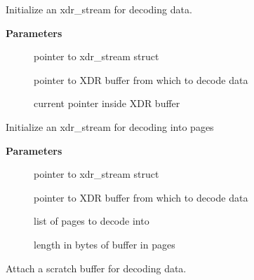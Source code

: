\documentclass[a4paper,8pt,english]{sphinxmanual}
\begin{document}
\begin{fulllineitems}
\label{networking/kapi:c.xdr_init_decode}
Initialize an xdr\_stream for decoding data.

\end{fulllineitems}


\textbf{Parameters}
\begin{description}
\item[{}] \leavevmode
pointer to xdr\_stream struct

\item[{}] \leavevmode
pointer to XDR buffer from which to decode data

\item[{}] \leavevmode
current pointer inside XDR buffer

\end{description}

\begin{fulllineitems}
\label{networking/kapi:c.xdr_init_decode_pages}
Initialize an xdr\_stream for decoding into pages

\end{fulllineitems}


\textbf{Parameters}
\begin{description}
\item[{}] \leavevmode
pointer to xdr\_stream struct

\item[{}] \leavevmode
pointer to XDR buffer from which to decode data

\item[{}] \leavevmode
list of pages to decode into

\item[{}] \leavevmode
length in bytes of buffer in pages

\end{description}

\begin{fulllineitems}
\label{networking/kapi:c.xdr_set_scratch_buffer}
Attach a scratch buffer for decoding data.

\end{fulllineitems}
\end{document}
